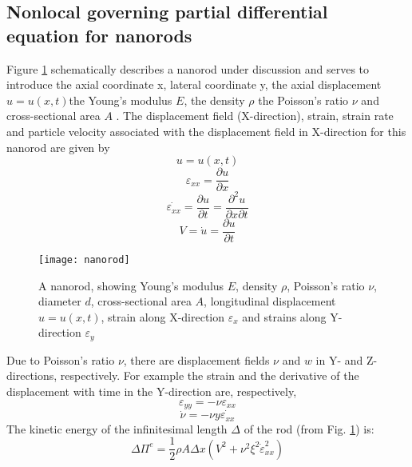 \subsection{Nonlocal governing partial differential\\ equation for nanorods}
Figure \ref{nanorod} schematically describes a nanorod under discussion and
serves to introduce the axial coordinate x, lateral coordinate y, the
axial displacement $u = u(x,t)$the Young’s modulus $E$, the density $\rho$ the Poisson’s ratio $\nu$ and cross-sectional area $A$ . The displacement
field (X-direction), strain, strain rate and particle velocity associated with the displacement field in X-direction for this nanorod
are given by\\
\begin{equation}
u=u(x,t)
\end{equation}
\begin{equation}
\varepsilon_{xx}=\frac{\partial u}{\partial x}
\end{equation}
\begin{equation}
\dot{\varepsilon_{xx}}=\frac{\partial u}{\partial t} = \frac{\partial^2 u}{\partial x \partial t}
\end{equation}
\begin{equation}
V = \dot{u} = \frac{\partial u}{\partial t}
\end{equation}
\begin{figure}[b]
\centering
\texttt{[image: nanorod]}
\caption{A nanorod, showing Young’s modulus $E$, density $\rho$, Poisson’s ratio $\nu$, diameter $d$, cross-sectional area $A$, longitudinal displacement $u=u(x,t)$, strain along X-direction $\varepsilon_x$ and strains along Y-direction $\varepsilon_y$}
\label{nanorod}
\end{figure}
Due to Poisson’s ratio $\nu$, there are displacement fields $\nu$ and $w$ in
Y- and Z-directions, respectively. For example the strain and the
derivative of the displacement with time in the Y-direction are,
respectively,\\
\begin{equation}
\varepsilon_{yy}=-\nu \varepsilon_{xx}
\end{equation}
\begin{equation}
\dot{\nu}=-\nu y\dot{\varepsilon_{xx}}
\end{equation}
The kinetic energy of the infinitesimal length $\Delta$ of the rod (from Fig. \ref{nanorod}) is:\\
\begin{equation}
\Delta \Pi^e = \frac{1}{2} \rho A \Delta x (V^2+\nu^2 \xi^2 \dot{\varepsilon}^2_{xx})
\end{equation}
